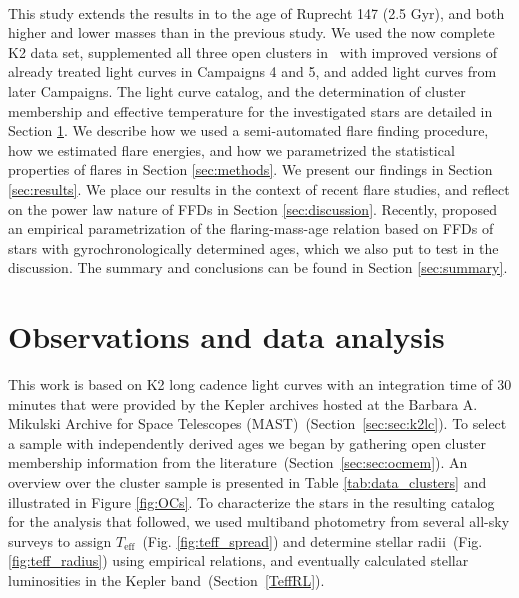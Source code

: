 \documentclass{aa}
\begin{document}
\\
This study extends the results in  to the age of Ruprecht 147 (2.5 Gyr), and both higher and lower masses than in the previous study. We used the now complete K2 data set, supplemented all three open clusters in~ with improved versions of already treated light curves in Campaigns 4 and 5, and added light curves from later Campaigns. The light curve catalog, and the determination of cluster membership and effective temperature for the investigated stars are detailed in Section \ref{sec:data}. We describe how we used a semi-automated flare finding procedure, how we estimated flare energies, and how we parametrized the statistical properties of flares in Section \ref{sec:methods}. We present our findings in Section \ref{sec:results}. We place our results in the context of recent flare studies, and reflect on the power law nature of FFDs in Section \ref{sec:discussion}. Recently, \citet{davenport2019} proposed an empirical parametrization of the flaring-mass-age relation based on FFDs of stars with gyrochronologically determined ages, which we also put to test in the discussion. The summary and conclusions can be found in Section \ref{sec:summary}.
\section{Observations and data analysis}
\label{sec:data}
This work is based on K2 long cadence light curves with an integration time of 30 minutes that were provided by the Kepler archives hosted at the Barbara A. Mikulski Archive for Space Telescopes (MAST)~(Section~\ref{sec:sec:k2lc}). To select a sample with independently derived ages we began by gathering open cluster membership information from the literature~(Section~\ref{sec:sec:ocmem}). An overview over the cluster sample is presented in Table \ref{tab:data_clusters} and illustrated in Figure \ref{fig:OCs}. To characterize the stars in the resulting catalog for the analysis that followed, we used multiband photometry from several all-sky surveys to assign $T_\mathrm{eff}$~(Fig. \ref{fig:teff_spread}) and determine stellar radii~(Fig. \ref{fig:teff_radius}) using empirical relations, and eventually calculated stellar luminosities in the Kepler band~(Section~\ref{TeffRL}).
\end{document}
